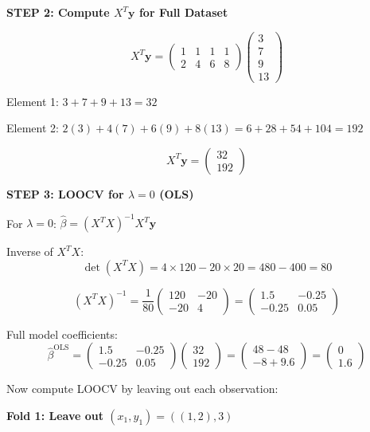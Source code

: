 \documentclass[12pt]{article}
\begin{document}
\begin{solution}
\textbf{STEP 2: Compute $X^T\mathbf{y}$ for Full Dataset}

\[X^T\mathbf{y} = \begin{pmatrix} 1 & 1 & 1 & 1 \\ 2 & 4 & 6 & 8 \end{pmatrix} \begin{pmatrix} 3 \\ 7 \\ 9 \\ 13 \end{pmatrix}\]

Element 1: $3 + 7 + 9 + 13 = 32$

Element 2: $2(3) + 4(7) + 6(9) + 8(13) = 6 + 28 + 54 + 104 = 192$

\[X^T\mathbf{y} = \begin{pmatrix} 32 \\ 192 \end{pmatrix}\]

\textbf{STEP 3: LOOCV for $\lambda = 0$ (OLS)}

For $\lambda = 0$: $\hat{\beta} = (X^TX)^{-1}X^T\mathbf{y}$

Inverse of $X^TX$:
\[\det(X^TX) = 4 \times 120 - 20 \times 20 = 480 - 400 = 80\]

\[(X^TX)^{-1} = \frac{1}{80}\begin{pmatrix} 120 & -20 \\ -20 & 4 \end{pmatrix} = \begin{pmatrix} 1.5 & -0.25 \\ -0.25 & 0.05 \end{pmatrix}\]

Full model coefficients:
\[\hat{\beta}^{\text{OLS}} = \begin{pmatrix} 1.5 & -0.25 \\ -0.25 & 0.05 \end{pmatrix}\begin{pmatrix} 32 \\ 192 \end{pmatrix} = \begin{pmatrix} 48 - 48 \\ -8 + 9.6 \end{pmatrix} = \begin{pmatrix} 0 \\ 1.6 \end{pmatrix}\]

Now compute LOOCV by leaving out each observation:

\textbf{Fold 1: Leave out $(x_1, y_1) = ((1,2), 3)$}


\end{solution}
\end{document}
